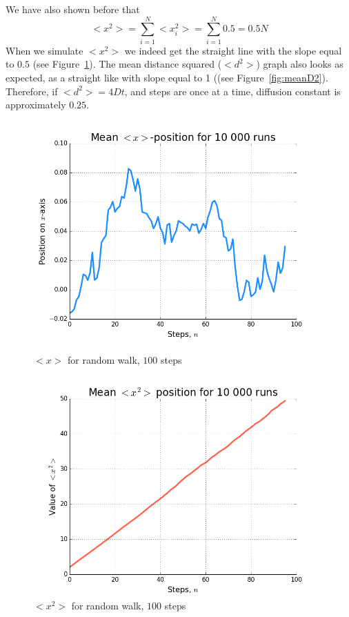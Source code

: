 \documentclass[12pt]{article}
\begin{document}
We have also shown before that
\begin{equation}
    <x^2>=\sum_{i=1}^N <x_i^2>=\sum_{i=1}^N 0.5=0.5N
\end{equation}
When we simulate $<x^2>$ we indeed get the straight line with the slope equal to $0.5$ (see Figure~\ref{fig:meanX2}). 
The mean distance squared ($<d^2>$) graph also looks as expected, as a straight like with slope equal to 1 ((see Figure~\ref{fig:meanD2}).
Therefore, if $<d^2>=4Dt$, and steps are once at a time, diffusion constant is approximately $0.25$.

\begin{figure}[!htb]
  \includegraphics[width=\linewidth]{meanX.png}
  \caption{$<x>$ for random walk, $100$ steps}\label{fig:meanX}
\endminipage\hfill
{}
  \includegraphics[width=\linewidth]{meanX2.png}
  \caption{$<x^2>$ for random walk, $100$ steps}\label{fig:meanX2}
\endminipage\hfill
\end{figure}
\end{document}
